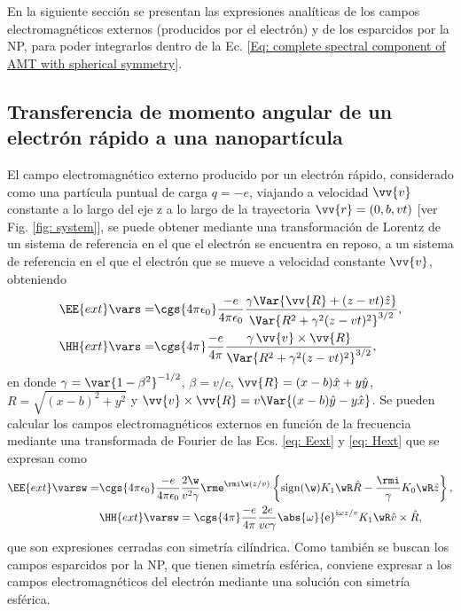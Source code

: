 En la siguiente sección se presentan las expresiones analíticas de los campos electromagnéticos externos (producidos por el electrón) y de los esparcidos por la NP, para poder integrarlos dentro de la Ec. \eqref{Eq: complete spectral component of AMT with spherical symmetry}.
%
%
\subsection{Transferencia de momento angular de un electrón rápido a una nanopartícula}
El campo electromagnético externo producido por un electrón rápido, considerado como una partícula puntual de carga $q=-e$, viajando a velocidad $\vv{v}$ constante a lo largo del eje z a lo largo de la trayectoria $\vv{r}=(0,b,vt)$ [ver Fig. \ref{fig: system}], se puede obtener mediante una transformación de Lorentz de un sistema de referencia en el que el electrón se encuentra en reposo, a un sistema de referencia en el que el electrón que se mueve a velocidad constante $\vv{v}$, obteniendo \cite{jackson}
\begin{align}
\EE{ext}\vars =& \cgs{4\pi\epsilon_0}\frac{-e}{4\pi\epsilon_0}\frac{\gamma \Var{\vv{R}+(z-vt)\hat{z}}}{\Var{R^2+\gamma^2(z-vt)^2}^{3/2}}, \label{eq: Eext}\\
\HH{ext}\vars =& \cgs{4\pi}\frac{-e}{4\pi}\frac{\gamma \, \vv{v}\times\vv{R}}{\Var{R^2+\gamma^2(z-vt)^2}^{3/2}}, \label{eq: Hext}
\end{align}
en donde $\gamma = \var{1-\beta^2}^{-1/2}$, $\beta = v/c$, $\vv{R}=(x-b)\hat{x}+y\hat{y}$, $R = \sqrt{(x-b)^2+y^2}$ y $\vv{v}\times\vv{R}=v\Var{(x-b)\hat{y}-y\hat{x}}$. Se pueden calcular los campos electromagnéticos externos en función de la frecuencia mediante una transformada de Fourier de las Ecs. \eqref{eq: Eext} y \eqref{eq: Hext} que se expresan como \cite{maciel2019electromagnetic}
\begin{align}
\EE{ext}\varsw = &\cgs{4\pi\epsilon_0}\frac{-e}{4\pi\epsilon_0}  \frac{2\w}{v^2 \gamma} \rme^{\rmi \w (z/v)} \left\{ {\rm sign}(\w) K_1\wR\hat{R} - \frac{\rmi}{\gamma}K_0\wR \hat{z}\right\},\\
&\HH{ext}\varsw = \cgs{4\pi}\frac{-e}{4\pi}\frac{2e}{v c \gamma} \abs{\omega} {\rm e}^{{\rm i}\omega z /v} K_1\wR \hat{v}\times\hat{R},
\end{align}
que son expresiones cerradas con simetría cilíndrica. Como también se buscan los campos esparcidos por la NP, que tienen simetría esférica, conviene expresar a los campos electromagnéticos del electrón mediante una solución con simetría esférica. 

